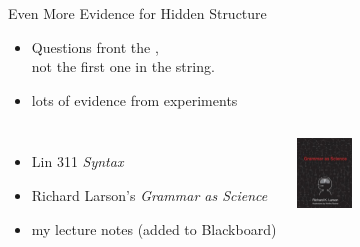 \documentclass[xcolor={usenames,svgnames,x11names,dvipsnames,table}]{beamer}
\begin{document}
\begin{frame}{Even More Evidence for Hidden Structure}
    \begin{itemize}
        \item Questions front the ,\\
            not the first one in the string.
    \end{itemize}
    \begin{exe}
        \ex
        \begin{xlist}
        \end{xlist}
    \end{exe}
    \begin{itemize}
        \item lots of evidence from experiments\\
    \end{itemize}

    \begin{followup}
        \begin{columns}
            \begin{itemize}
                \item Lin 311 \emph{Syntax}
                \item Richard Larson's \emph{Grammar as Science}
                \item my lecture notes (added to Blackboard)
            \end{itemize}

            \quad
            \includegraphics[height=5em]{./img/grammarasscience}
            \quad
            \phantom{a}
        \end{columns}
    \end{followup}
\end{frame}
\end{document}
